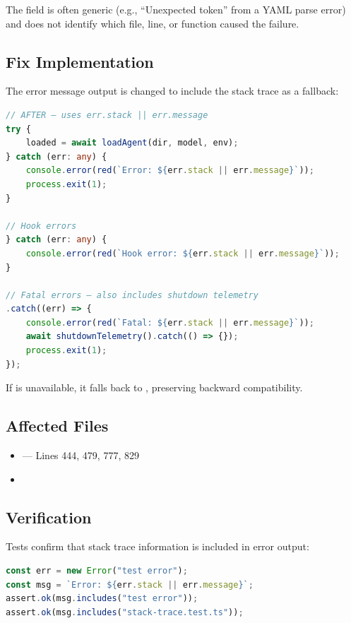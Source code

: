 The  field is often generic (e.g., ``Unexpected token'' from a YAML parse error) and does not identify which file, line, or function caused the failure.

\subsection*{Fix Implementation}
The error message output is changed to include the stack trace as a fallback:

\begin{lstlisting}[language=TypeScript]
// AFTER — uses err.stack || err.message
try {
    loaded = await loadAgent(dir, model, env);
} catch (err: any) {
    console.error(red(`Error: ${err.stack || err.message}`));
    process.exit(1);
}

// Hook errors
} catch (err: any) {
    console.error(red(`Hook error: ${err.stack || err.message}`));
}

// Fatal errors — also includes shutdown telemetry
.catch((err) => {
    console.error(red(`Fatal: ${err.stack || err.message}`));
    await shutdownTelemetry().catch(() => {});
    process.exit(1);
});
\end{lstlisting}

If  is unavailable, it falls back to , preserving backward compatibility.

\subsection*{Affected Files}
\begin{itemize}
    \item {} — Lines 444, 479, 777, 829
    \item {}
\end{itemize}

\subsection*{Verification}
Tests confirm that stack trace information is included in error output:

\begin{lstlisting}[language=TypeScript]
const err = new Error("test error");
const msg = `Error: ${err.stack || err.message}`;
assert.ok(msg.includes("test error"));
assert.ok(msg.includes("stack-trace.test.ts"));
\end{lstlisting}
